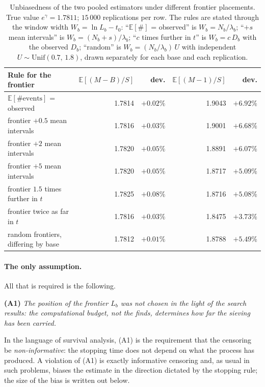 \documentclass[11pt,a4paper]{article}
\theoremstyle{plain}
\theoremstyle{remark}
\newcommand{\eg}{e^{\gamma}}
\begin{document}
\begin{table}[t]
\centering
\caption{Unbiasedness of the two pooled estimators under different frontier
placements. True value $\eg=1.7811$; $15\,000$ replications per row. The rules
are stated through the window width $W_b=\ln L_b-t_0$: ``$\mathbb E[\#]$ =
observed'' is $W_b=N_b/\lambda_b$; ``$+s$ mean intervals'' is
$W_b=(N_b+s)/\lambda_b$; ``$c$ times further in $t$'' is $W_b=c\,D_b$ with the
observed $D_b$; ``random'' is $W_b=(N_b/\lambda_b)\,U$ with independent
$U\sim\mathrm{Unif}(0.7,\,1.8)$, drawn separately for each base and each
replication.}
\label{tab:frontier}
\small
\begin{tabular}{lrrrr}
\toprule
Rule for the frontier & $\mathbb E[(M{-}B)/S]$ & dev. & $\mathbb E[(M{-}1)/S]$ & dev.\\
\midrule
$\mathbb E[\#\text{events}]$ = observed & 1.7814 & $+0.02\%$ & 1.9043 & $+6.92\%$\\
frontier $+0.5$ mean intervals & 1.7816 & $+0.03\%$ & 1.9001 & $+6.68\%$\\
frontier $+2$ mean intervals & 1.7820 & $+0.05\%$ & 1.8891 & $+6.07\%$\\
frontier $+5$ mean intervals & 1.7820 & $+0.05\%$ & 1.8717 & $+5.09\%$\\
frontier $1.5$ times further in $t$ & 1.7825 & $+0.08\%$ & 1.8716 & $+5.08\%$\\
frontier twice as far in $t$ & 1.7816 & $+0.03\%$ & 1.8475 & $+3.73\%$\\
random frontiers, differing by base & 1.7812 & $+0.01\%$ & 1.8788 & $+5.49\%$\\
\bottomrule
\end{tabular}
\end{table}

\paragraph{The only assumption.} All that is required is the following.

\medskip
\noindent\textbf{(A1)} \emph{The position of the frontier $L_b$ was not chosen in
the light of the search results: the computational budget, not the finds,
determines how far the sieving has been carried.}

\medskip
\noindent In the language of survival analysis, (A1) is the requirement that the
censoring be \emph{non-informative}: the stopping time does not depend on what
the process has produced. A violation of (A1) is exactly informative censoring
and, as usual in such problems, biases the estimate in the direction dictated by
the stopping rule; the size of the bias is written out below.
\end{document}
